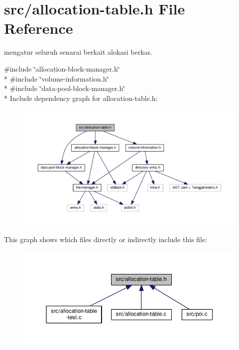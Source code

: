 \hypertarget{allocation-table_8h}{\section{src/allocation-\/table.h File Reference}
\label{allocation-table_8h}
}


mengatur seluruh senarai berkait alokasi berkas.  


{\ttfamily \#include \char`\"{}allocation-\/block-\/manager.\-h\char`\"{}}\\*
{\ttfamily \#include \char`\"{}volume-\/information.\-h\char`\"{}}\\*
{\ttfamily \#include \char`\"{}data-\/pool-\/block-\/manager.\-h\char`\"{}}\\*
Include dependency graph for allocation-\/table.h\-:\nopagebreak
\begin{figure}[H]
\begin{center}
\leavevmode
\includegraphics[width=350pt]{allocation-table_8h__incl}
\end{center}
\end{figure}
This graph shows which files directly or indirectly include this file\-:
\nopagebreak
\begin{figure}[H]
\begin{center}
\leavevmode
\includegraphics[width=350pt]{allocation-table_8h__dep__incl}
\end{center}
\end{figure}
